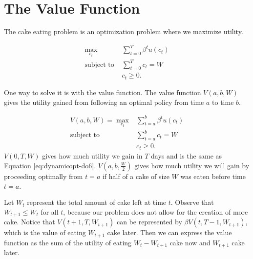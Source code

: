 %
%



\section*{The Value Function}

The cake eating problem is an optimization problem where we maximize utility.

\begin{align}\label{eq:dynamicopt-do6}
\max_{c_t}  &\sum_{t=0}^T \beta^t u(c_t) \\
\mbox{subject to } &\sum_{t=0}^T c_t = W \nonumber\\
&c_t \geq 0.\nonumber
\end{align}

One way to solve it is with the value function.
The value function $V(a,b,W)$ gives the utility gained from following an optimal policy from time $a$ to time $b$.

\begin{align*}
V(a,b,W) = \max_{c_t} & \sum_{t=a}^b \beta^tu(c_t) \\
\mbox{subject to } & \sum_{t=a}^b c_t = W \\
& c_t \geq 0.
\end{align*}
$V(0,T,W)$ gives how much utility we gain in $T$ days and is the same as Equation \ref{eq:dynamicopt-do6}.
$V(a, b, \frac{W}{2})$ gives how much utility we will gain by proceeding optimally from $t=a$ if half of a cake of size $W$ was eaten before time $t=a$.

Let $W_t$ represent the total amount of cake left at time $t$.
Observe that $W_{t+1} \leq W_t$ for all $t$, because our problem does not allow for the creation of more cake.
Notice that $V(t+1, T, W_{t+1})$ can be represented by $\beta V(t, T-1, W_{t+1})$, which is the value of eating $W_{t+1}$ cake later.
Then we can express the value function as the sum of the utility of eating $W_t-W_{t+1}$ cake now and $W_{t+1}$ cake later.

